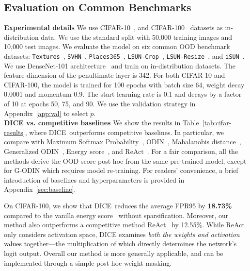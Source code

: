 \documentclass[runningheads]{llncs}
\newcommand{\methodAbbr}{DICE~}
\begin{document}
\subsection{Evaluation on Common Benchmarks}
\label{sec:common_benchmark}

\noindent \textbf{Experimental details}
We use  CIFAR-10~\cite{krizhevsky2009learning}, and CIFAR-100~\cite{krizhevsky2009learning} datasets as in-distribution data. We use the standard split with 50,000 training images and 10,000 test images. We evaluate the model on six common OOD benchmark datasets: \texttt{Textures}~\cite{cimpoi2014describing}, \texttt{SVHN}~\cite{netzer2011reading}, \texttt{Places365}~\cite{zhou2017places}, \texttt{LSUN-Crop}~\cite{yu2015lsun}, \texttt{LSUN-Resize}~\cite{yu2015lsun}, and \texttt{iSUN}~\cite{xu2015turkergaze}. We use DenseNet-101 architecture~\cite{huang2017densely} and train on in-distribution datasets. The feature dimension of the penultimate layer is 342. For both CIFAR-10 and CIFAR-100, the model is trained for 100 epochs with batch size 64, weight
decay 0.0001 and momentum 0.9. The start learning rate is 0.1 and decays by a factor of 10 at epochs 50, 75, and 90. We use the validation strategy in Appendix~\ref{app:val} to select $p$. \\


\noindent \textbf{DICE vs. competitive baselines} We show the results in Table~\ref{tab:cifar-results}, where \methodAbbr outperforms competitive baselines. In particular, we compare with Maximum Softmax Probability~\cite{Kevin}, ODIN~\cite{liang2018enhancing}, Mahalanobis distance~\cite{lee2018simple}, Generalized ODIN~\cite{godin2020CVPR}, Energy score~\cite{liu2020energy}, and ReAct~\cite{sun2021react}. For a fair comparison, all the methods derive the OOD score post hoc from the same pre-trained model, except for G-ODIN which requires model re-training. {For readers' convenience, a brief introduction of baselines and hyperparameters is provided in Appendix~\ref{sec:baseline}.} 

On CIFAR-100, we show that \methodAbbr reduces the average FPR95 by \textbf{18.73\%} compared to the vanilla energy score~\cite{liu2020energy} without sparsification. Moreover, our method also outperforms a competitive method ReAct~\cite{sun2021react} by {12.55\%}. While {ReAct} only considers activation space, {DICE} examines \emph{both the {weights} and activation} values together---the multiplication of which {directly} determines the network's logit output. 
{Overall our method is more generally applicable}, and can be implemented through a simple {post hoc} weight masking. \\
\end{document}
